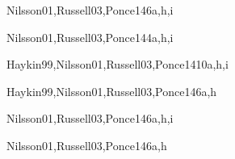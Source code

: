 \begin{syllabus}
\begin{unit}{\ISAgentsDef}{}{Nilsson01,Russell03,Ponce14}{6}{a,h,i}
    \ISAgentsAllTopics
    \ISAgentsAllObjectives
\end{unit}

\begin{unit}{\ISNaturalLanguageProcessingDef}{}{Nilsson01,Russell03,Ponce14}{4}{a,h,i}
    \ISNaturalLanguageProcessingAllTopics
    \ISNaturalLanguageProcessingAllObjectives
\end{unit}

\begin{unit}{\ISMachineLearningDef}{}{Haykin99,Nilsson01,Russell03,Ponce14}{10}{a,h,i}
    \ISMachineLearningAllTopics
    \ISMachineLearningAllObjectives
\end{unit}

\begin{unit}{\ISPlanningSystemsDef}{}{Haykin99,Nilsson01,Russell03,Ponce14}{6}{a,h}
    \ISPlanningSystemsAllTopics
    \ISPlanningSystemsAllObjectives
\end{unit}

\begin{unit}{\ISRoboticsDef}{}{Nilsson01,Russell03,Ponce14}{6}{a,h,i}
    \ISRoboticsAllTopics
    \ISRoboticsAllObjectives
\end{unit}

\begin{unit}{\ISPerceptionDef}{}{Nilsson01,Russell03,Ponce14}{6}{a,h}
    \ISPerceptionAllTopics
    \ISPerceptionAllObjectives
\end{unit}

\begin{coursebibliography}
\end{coursebibliography}

\end{syllabus}

